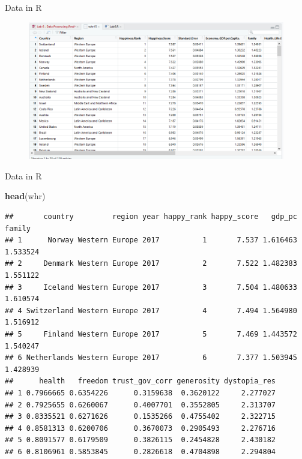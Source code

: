 \documentclass[ignorenonframetext,]{beamer}
\newenvironment{Shaded}{\begin{snugshade}}{\end{snugshade}}
\newcommand{\KeywordTok}[1]{\textcolor[rgb]{0.13,0.29,0.53}{\textbf{#1}}}
\newcommand{\NormalTok}[1]{#1}
\begin{document}
\begin{frame}{Data in R}

\begin{figure}
\centering
  \includegraphics[scale=0.4]{img/View.png}
\end{figure}

\end{frame}

\begin{frame}[fragile]{Data in R}

\scriptsize

\begin{Shaded}
\begin{Highlighting}[]
\KeywordTok{head}\NormalTok{(whr)}
\end{Highlighting}
\end{Shaded}

\begin{verbatim}
##       country         region year happy_rank happy_score   gdp_pc   family
## 1      Norway Western Europe 2017          1       7.537 1.616463 1.533524
## 2     Denmark Western Europe 2017          2       7.522 1.482383 1.551122
## 3     Iceland Western Europe 2017          3       7.504 1.480633 1.610574
## 4 Switzerland Western Europe 2017          4       7.494 1.564980 1.516912
## 5     Finland Western Europe 2017          5       7.469 1.443572 1.540247
## 6 Netherlands Western Europe 2017          6       7.377 1.503945 1.428939
##      health   freedom trust_gov_corr generosity dystopia_res
## 1 0.7966665 0.6354226      0.3159638  0.3620122     2.277027
## 2 0.7925655 0.6260067      0.4007701  0.3552805     2.313707
## 3 0.8335521 0.6271626      0.1535266  0.4755402     2.322715
## 4 0.8581313 0.6200706      0.3670073  0.2905493     2.276716
## 5 0.8091577 0.6179509      0.3826115  0.2454828     2.430182
## 6 0.8106961 0.5853845      0.2826618  0.4704898     2.294804
\end{verbatim}

\end{frame}
\end{document}
